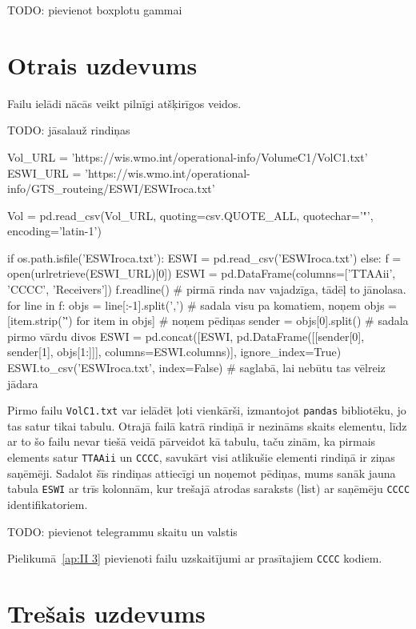 \documentclass[12pt,a4paper]{article}
\begin{document}
TODO: pievienot boxplotu gammai

\section*{Otrais uzdevums}
Failu ielādi nācās veikt pilnīgi atšķirīgos veidos.

TODO: jāsalauž rindiņas
\begin{verbatim*}
Vol_URL = 'https://wis.wmo.int/operational-info/VolumeC1/VolC1.txt'
ESWI_URL = 'https://wis.wmo.int/operational-info/GTS_routeing/ESWI/ESWIroca.txt'

Vol = pd.read_csv(Vol_URL, quoting=csv.QUOTE_ALL, quotechar='"', encoding='latin-1')

if os.path.isfile('ESWIroca.txt'):
    ESWI = pd.read_csv('ESWIroca.txt')
else:
    f = open(urlretrieve(ESWI_URL)[0])
    ESWI = pd.DataFrame(columns=['TTAAii', 'CCCC', 'Receivers'])
    f.readline()    # pirmā rinda nav vajadzīga, tādēļ to jānolasa.
    for line in f:
        objs = line[:-1].split(',')                     # sadala visu pa komatiem, noņem \n
        objs = [item.strip('\"') for item in objs]      # noņem pēdiņas
        sender = objs[0].split()                        # sadala pirmo vārdu divos
        ESWI = pd.concat([ESWI, pd.DataFrame([[sender[0], sender[1], objs[1:]]], columns=ESWI.columns)], ignore_index=True)
    ESWI.to_csv('ESWIroca.txt', index=False)            # saglabā, lai nebūtu tas vēlreiz jādara
\end{verbatim*}
Pirmo failu \texttt{VolC1.txt} var ielādēt ļoti vienkārši, izmantojot \texttt{pandas} bibliotēku, jo tas satur tikai tabulu. Otrajā failā katrā rindiņā ir nezināms skaits elementu, līdz ar to šo failu nevar tiešā veidā pārveidot kā tabulu, taču zinām, ka pirmais elements satur \texttt{TTAAii} un \texttt{CCCC}, savukārt visi atlikušie elementi rindiņā ir ziņas saņēmēji. Sadalot šīs rindiņas attiecīgi un noņemot pēdiņas, mums sanāk jauna tabula \texttt{ESWI} ar trīs kolonnām, kur trešajā atrodas saraksts (list) ar saņēmēju \texttt{CCCC} identifikatoriem.


TODO: pievienot telegrammu skaitu un valstis

Pielikumā~\ref{ap:II 3} pievienoti failu uzskaitījumi ar prasītajiem \texttt{CCCC} kodiem.

\section*{Trešais uzdevums}
\end{document}
